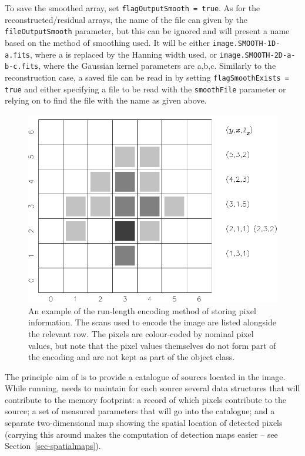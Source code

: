 To save the smoothed array, set \texttt{flagOutputSmooth = true}. As
for the reconstructed/residual arrays, the
name of the file can given by the \texttt{fileOutputSmooth} parameter,
but this can be ignored and \duchamp will present a name based on the
method of smoothing used. It will be either
\texttt{image.SMOOTH-1D-a.fits}, where a is replaced by the Hanning
width used, or \texttt{image.SMOOTH-2D-a-b-c.fits}, where the Gaussian
kernel parameters are a,b,c. Similarly to the reconstruction case, a
saved file can be read in by setting \texttt{flagSmoothExists = true}
and either specifying a file to be read with the \texttt{smoothFile}
parameter or relying on \duchamp to find the file with the name as
given above.


\label{sec-detection}

\label{sec-scan}

\begin{figure}
\includegraphics[width=\textwidth]{exampleObject}
\caption{An example of the run-length encoding method of storing
pixel information. The scans used to encode the image are listed
alongside the relevant row. The pixels are colour-coded by
nominal pixel values, but note that the pixel values themselves
do not form part of the encoding and are not kept as part of the
object class. }
\label{fig-objExample}
\end{figure}

The principle aim of \duchamp is to provide a catalogue of sources
located in the image. While running, \duchamp needs to maintain for
each source several data structures that will contribute to the memory
footprint: a record of which pixels contribute to the source; a set of
measured parameters that will go into the catalogue; and a separate
two-dimensional map showing the spatial location of detected pixels
(carrying this around makes the computation of detection maps easier
-- see Section~\ref{sec-spatialmaps}).

